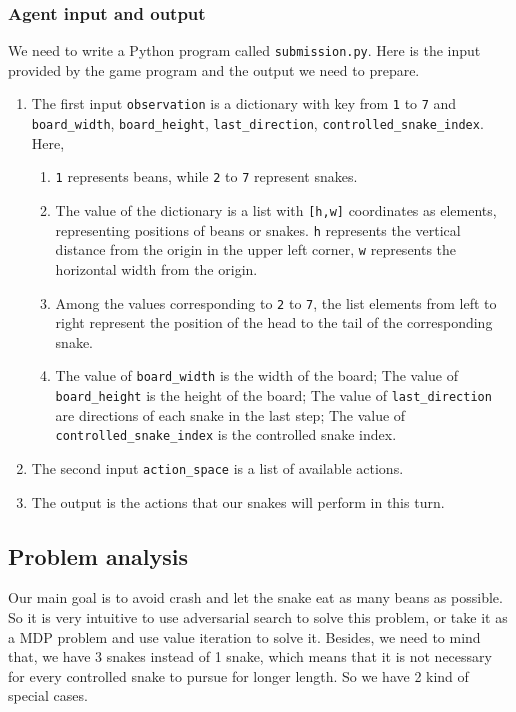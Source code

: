 \documentclass{article}
\begin{document}
\subsubsection{Agent input and output}

We need to write a Python program called \texttt{submission.py}. Here is the input provided by the game program and the output we need to prepare.

\begin{enumerate}
    \item The first input \texttt{observation} is a dictionary with key from \texttt{1} to \texttt{7} and \texttt{board\_width}, \texttt{board\_height}, \texttt{last\_direction}, \texttt{controlled\_snake\_index}. Here, 
    
    \begin{enumerate}
        \item \texttt{1} represents beans, while \texttt{2} to \texttt{7} represent snakes.
        \item The value of the dictionary is a list with \texttt{[h,w]} coordinates as elements, representing positions of beans or snakes. \texttt{h} represents the vertical distance from the origin in the upper left corner, \texttt{w} represents the horizontal width from the origin.
        \item Among the values corresponding to \texttt{2} to \texttt{7}, the list elements from left to right represent the position of the head to the tail of the corresponding snake.
        \item The value of \texttt{board\_width} is the width of the board; The value of \texttt{board\_height} is the height of the board; The value of \texttt{last\_direction} are directions of each snake in the last step; The value of \texttt{controlled\_snake\_index} is the controlled snake index.
    \end{enumerate}
    \item The second input \texttt{action\_space} is a list of available actions.
    \item The output is the actions that our snakes will perform in this turn.
\end{enumerate}

\subsection{Problem analysis}

Our main goal is to avoid crash and let the snake eat as many beans as possible. So it is very intuitive to use adversarial search to solve this problem, or take it as a MDP problem and use value iteration to solve it. Besides, we need to mind that, we have 3 snakes instead of 1 snake, which means that it is not necessary for every controlled snake to pursue for longer length. So we have 2 kind of special cases.
\end{document}
